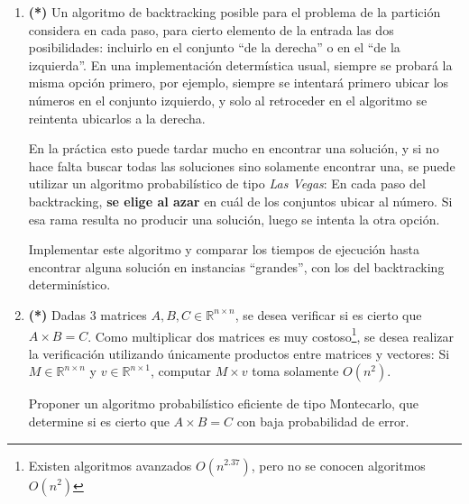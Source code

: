 \documentclass{article}
\begin{document}
    \begin{enumerate}[resume]
        \item\textbf{(*)} Un algoritmo de backtracking posible para el problema de la partición considera en cada paso, para cierto elemento de la entrada las dos posibilidades: incluirlo en el conjunto ``de la derecha'' o en el ``de la izquierda''. En una implementación determística usual, siempre se probará la misma opción primero, por ejemplo, siempre se intentará primero ubicar los números en el conjunto izquierdo, y solo al retroceder en el algoritmo se reintenta ubicarlos a la derecha.
        
              En la práctica esto puede tardar mucho en encontrar una solución, y si no hace falta buscar todas las soluciones sino solamente encontrar una, se
               puede utilizar un algoritmo probabilístico de tipo \textit{Las Vegas}: En cada paso del backtracking, \textbf{se elige al azar} en cuál de los conjuntos ubicar al número. Si esa rama resulta no producir una solución, luego se intenta la otra opción.
               
               Implementar este algoritmo y comparar los tiempos de ejecución hasta encontrar alguna solución en instancias ``grandes'', con los del backtracking determinístico.
        \item\textbf{(*)} Dadas 3 matrices $A,B,C \in \mathbb{R}^{n \times n}$, se desea verificar si es cierto que $A \times B = C$. Como multiplicar dos matrices es muy costoso\footnote{Existen algoritmos avanzados $O(n^{2.37})$, pero no se conocen algoritmos $O(n^2)$}, se desea realizar la verificación utilizando únicamente productos entre matrices y vectores: Si $M \in \mathbb{R}^{n\times n}$ y $v \in \mathbb{R}^{n\times 1}$, computar $M \times v$ toma solamente $O(n^2)$.
               
               Proponer un algoritmo probabilístico eficiente de tipo Montecarlo, que determine si es cierto que $A \times B = C$ con baja probabilidad de error.
    \end{enumerate}
\end{document}
